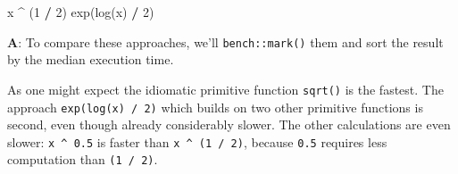 \documentclass[
]{krantz}
\makeatletter
\newenvironment{Shaded}{\begin{snugshade}}{\end{snugshade}}
\newcommand{\CommentTok}[1]{\textcolor[rgb]{0.56,0.35,0.01}{\textit{#1}}}
\newcommand{\DecValTok}[1]{\textcolor[rgb]{0.00,0.00,0.81}{#1}}
\newcommand{\FloatTok}[1]{\textcolor[rgb]{0.00,0.00,0.81}{#1}}
\newcommand{\KeywordTok}[1]{\textcolor[rgb]{0.13,0.29,0.53}{\textbf{#1}}}
\newcommand{\NormalTok}[1]{#1}
\newcommand{\OperatorTok}[1]{\textcolor[rgb]{0.81,0.36,0.00}{\textbf{#1}}}
\newcommand{\StringTok}[1]{\textcolor[rgb]{0.31,0.60,0.02}{#1}}
\newenvironment{kframe}{%
\medskip{}
\setlength{\fboxsep}{.8em}
 \def\at@end@of@kframe{}%
 \ifinner\ifhmode%
  \def\at@end@of@kframe{\end{minipage}}%
  \begin{minipage}{\columnwidth}%
 \fi\fi%
 \def\FrameCommand##1{\hskip\@totalleftmargin \hskip-\fboxsep
 \colorbox{shadecolor}{##1}\hskip-\fboxsep
     \hskip-\linewidth \hskip-\@totalleftmargin \hskip\columnwidth}%
 \MakeFramed {\advance\hsize-\width
   \@totalleftmargin\z@ \linewidth\hsize
   \@setminipage}}%
 {\par\unskip\endMakeFramed%
 \at@end@of@kframe}
\renewenvironment{Shaded}{\begin{kframe}}{\end{kframe}}
\renewcommand{\KeywordTok} [1]{\textcolor[rgb]{0.00,0.44,0.13}{{#1}}}
\renewcommand{\DecValTok}  [1]{\textcolor[rgb]{0.25,0.63,0.44}{{#1}}}
\renewcommand{\FloatTok}   [1]{\textcolor[rgb]{0.25,0.63,0.44}{{#1}}}
\renewcommand{\StringTok}  [1]{\textcolor[rgb]{0.25,0.44,0.63}{{#1}}}
\renewcommand{\CommentTok} [1]{\textcolor[rgb]{0.38,0.63,0.69}{{#1}}}
\renewcommand{\NormalTok}  [1]{{#1}}
\makeatother
\begin{document}
\begin{Shaded}
\begin{Highlighting}[]
\NormalTok{x }\OperatorTok{^}\StringTok{ }\NormalTok{(}\DecValTok{1} \OperatorTok{/}\StringTok{ }\DecValTok{2}\NormalTok{)}
\KeywordTok{exp}\NormalTok{(}\KeywordTok{log}\NormalTok{(x) }\OperatorTok{/}\StringTok{ }\DecValTok{2}\NormalTok{)}
\end{Highlighting}
\end{Shaded}

\textbf{{A}}: To compare these approaches, we'll \texttt{bench::mark()} them and sort the result by the median execution time.

\begin{Shaded}
\end{Shaded}

As one might expect the idiomatic primitive function \texttt{sqrt()} is the fastest. The approach \texttt{exp(log(x)\ /\ 2)} which builds on two other primitive functions is second, even though already considerably slower. The other calculations are even slower: \texttt{x\ \^{}\ 0.5} is faster than \texttt{x\ \^{}\ (1\ /\ 2)}, because \texttt{0.5} requires less computation than \texttt{(1\ /\ 2)}.
\end{document}
